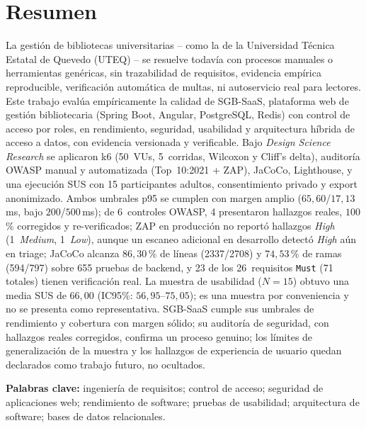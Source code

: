 \chapter*{Resumen}

La gestión de bibliotecas universitarias -- como la de la Universidad
Técnica Estatal de Quevedo (UTEQ) -- se resuelve todavía con procesos
manuales o herramientas genéricas, sin trazabilidad de requisitos,
evidencia empírica reproducible, verificación automática de multas, ni
autoservicio real para lectores. Este trabajo evalúa empíricamente la
calidad de SGB-SaaS, plataforma web de gestión bibliotecaria (Spring
Boot, Angular, PostgreSQL, Redis) con control de acceso por roles, en
rendimiento, seguridad, usabilidad y arquitectura híbrida de acceso a
datos, con evidencia versionada y verificable. Bajo \emph{Design
Science Research} se aplicaron k6 (50~VUs, 5~corridas, Wilcoxon y
Cliff's delta), auditoría OWASP manual y automatizada (Top~10:2021 +
ZAP), JaCoCo, Lighthouse, y una ejecución SUS con 15 participantes
adultos, consentimiento privado y export anonimizado. Ambos umbrales p95 se cumplen con
margen amplio ($65{,}60$/$17{,}13$\,ms, bajo $200$/$500$\,ms); de
6~controles OWASP, 4 presentaron hallazgos reales, $100$\,\%
corregidos y re-verificados; ZAP en producción no reportó hallazgos
\emph{High} (1~\emph{Medium}, 1~\emph{Low}), aunque un escaneo
adicional en desarrollo detectó \emph{High} aún en triage; JaCoCo
alcanza $86{,}30$\,\% de líneas (2337/2708) y $74{,}53$\,\% de ramas
(594/797) sobre 655
pruebas de backend, y 23 de los 26~requisitos
\texttt{Must} (71 totales) tienen verificación real. La muestra de
usabilidad ($N=15$) obtuvo una media SUS de $66{,}00$ (IC95\%:
$56{,}95$--$75{,}05$); es una muestra por conveniencia y no se presenta
como representativa. SGB-SaaS
cumple sus umbrales de rendimiento y cobertura con margen sólido; su
auditoría de seguridad, con hallazgos reales corregidos, confirma un
proceso genuino; los límites de generalización de la muestra y los
hallazgos de experiencia de usuario quedan declarados como trabajo futuro, no
ocultados.

\textbf{Palabras clave:} ingeniería de requisitos; control de acceso;
seguridad de aplicaciones web; rendimiento de software; pruebas de
usabilidad; arquitectura de software; bases de datos relacionales.

